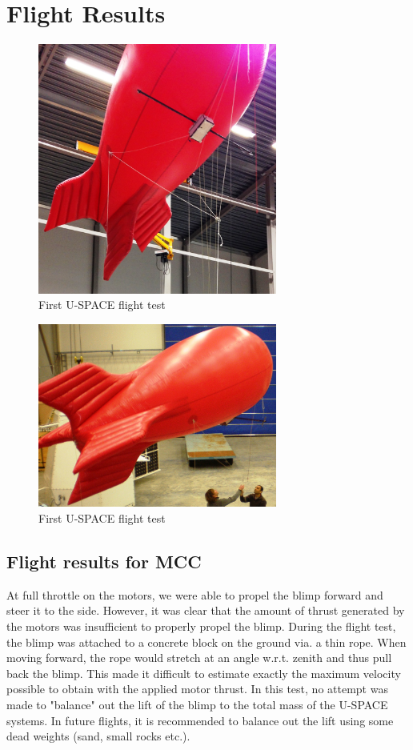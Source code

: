 \section{Flight Results}
\label{sec:flight_results}
%
%
\begin{figure}[H]
\centering
\includegraphics[width=0.7\textwidth]{figures/fig_FlightTest1_1}
\caption{First U-SPACE flight test}
\label{fig:FlightTest1_1}
\end{figure}
%
\begin{figure}[H]
\centering
\includegraphics[width=0.7\textwidth]{figures/fig_FlightTest1_2}
\caption{First U-SPACE flight test}
\label{fig:FlightTest1_2}
\end{figure}
%
\subsection{Flight results for MCC}
At full throttle on the motors, we were able to propel the blimp forward and steer it to the side. However, it was clear that the amount of thrust generated by the motors was insufficient to properly propel the blimp. During the flight test, the blimp was attached to a concrete block on the ground via. a thin rope. When moving forward, the rope would stretch at an angle w.r.t. zenith and thus pull back the blimp. This made it difficult to estimate exactly the maximum velocity possible to obtain with the applied motor thrust. In this test, no attempt was made to "balance" out the lift of the blimp to the total mass of the U-SPACE systems. In future flights, it is recommended to balance out the lift using some dead weights (sand, small rocks etc.).


